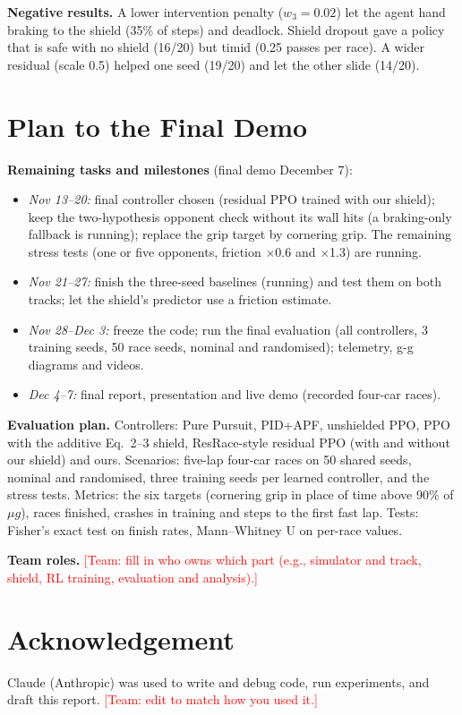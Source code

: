 \documentclass[conference]{IEEEtran}
\newcommand{\todo}[1]{\textcolor{red}{[#1]}}
\begin{document}
\textbf{Negative results.} A lower intervention penalty ($w_3 = 0.02$) let the agent hand braking to the
shield (35\% of steps) and deadlock. Shield dropout gave a policy that is safe with no shield (16/20) but timid
(0.25 passes per race). A wider residual (scale 0.5) helped one seed (19/20) and let the other slide (14/20).

\section{Plan to the Final Demo}
\textbf{Remaining tasks and milestones} (final demo December 7):
\begin{itemize}
\item \emph{Nov 13--20:} final controller chosen (residual PPO trained with our shield); keep the two-hypothesis
opponent check without its wall hits (a braking-only fallback is running); replace the grip target by cornering
grip. The remaining stress tests (one or five opponents, friction $\times$0.6 and $\times$1.3) are running.
\item \emph{Nov 21--27:} finish the three-seed baselines (running) and test them on both tracks; let the shield's
predictor use a friction estimate.
\item \emph{Nov 28--Dec 3:} freeze the code; run the final evaluation (all controllers, 3 training seeds, 50 race
seeds, nominal and randomised); telemetry, g-g diagrams and videos.
\item \emph{Dec 4--7:} final report, presentation and live demo (recorded four-car races).
\end{itemize}
\textbf{Evaluation plan.} Controllers: Pure Pursuit, PID+APF, unshielded PPO, PPO with the additive Eq.~2--3
shield, ResRace-style residual PPO (with and without our shield) and ours. Scenarios: five-lap four-car races on
50 shared seeds, nominal and randomised, three training seeds per learned controller, and the stress tests.
Metrics: the six targets (cornering grip in place of time above 90\% of $\mu g$), races finished, crashes in
training and steps to the first fast lap. Tests: Fisher's exact test on finish rates, Mann--Whitney U
on per-race values.

\textbf{Team roles.} \todo{Team: fill in who owns which part (e.g., simulator and track, shield, RL training,
evaluation and analysis).}

\section*{Acknowledgement}
Claude (Anthropic) was used to write and debug code, run experiments, and draft this report. \todo{Team: edit to
match how you used it.}
\end{document}

